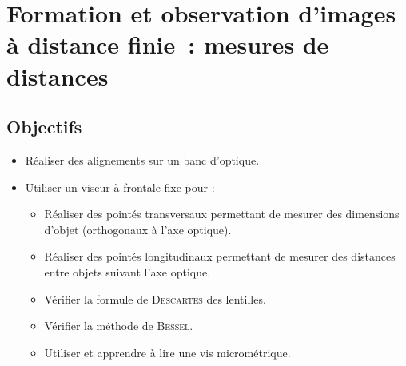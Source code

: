 \documentclass[../main/main.tex]{subfiles}
\begin{document}
\setcounter{chapter}{1}

\chapter{Formation et observation d'images \`a distance finie~: mesures de
  distances}


\section{Objectifs}

\begin{itemize}[label=$\diamond$, leftmargin=10pt]
	\item Réaliser des alignements sur un banc d'optique.
	\item Utiliser un viseur à frontale fixe pour :
	      \begin{itemize}[label=$\triangleright$]
		      \item Réaliser des pointés transversaux permettant de mesurer des
		            dimensions d'objet (orthogonaux à l'axe optique).
		      \item Réaliser des pointés longitudinaux permettant de mesurer des
		            distances entre objets suivant l'axe optique.
		      \item Vérifier la formule de \textsc{Descartes} des lentilles.
		      \item Vérifier la méthode de \textsc{Bessel}.
		      \item Utiliser et apprendre à lire une vis micrométrique.
	      \end{itemize}
\end{itemize}
\end{document}
